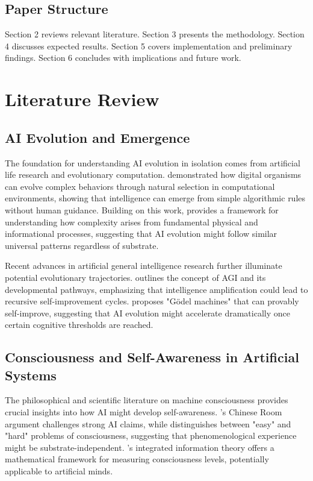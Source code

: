 \documentclass[12pt,a4paper]{article}
\begin{document}
\subsection{Paper Structure}

Section 2 reviews relevant literature. Section 3 presents the methodology. Section 4 discusses expected results. Section 5 covers implementation and preliminary findings. Section 6 concludes with implications and future work.

\section{Literature Review}

\subsection{AI Evolution and Emergence}

The foundation for understanding AI evolution in isolation comes from artificial life research and evolutionary computation. \citet{tierra} demonstrated how digital organisms can evolve complex behaviors through natural selection in computational environments, showing that intelligence can emerge from simple algorithmic rules without human guidance. Building on this work, \citet{morowitz} provides a framework for understanding how complexity arises from fundamental physical and informational processes, suggesting that AI evolution might follow similar universal patterns regardless of substrate.

Recent advances in artificial general intelligence research further illuminate potential evolutionary trajectories. \citet{goertzel} outlines the concept of AGI and its developmental pathways, emphasizing that intelligence amplification could lead to recursive self-improvement cycles. \citet{schmidhuber} proposes "Gödel machines" that can provably self-improve, suggesting that AI evolution might accelerate dramatically once certain cognitive thresholds are reached.

\subsection{Consciousness and Self-Awareness in Artificial Systems}

The philosophical and scientific literature on machine consciousness provides crucial insights into how AI might develop self-awareness. \citet{searle}'s Chinese Room argument challenges strong AI claims, while \citet{chalmers} distinguishes between "easy" and "hard" problems of consciousness, suggesting that phenomenological experience might be substrate-independent. \citet{tononi}'s integrated information theory offers a mathematical framework for measuring consciousness levels, potentially applicable to artificial minds.
\end{document}
